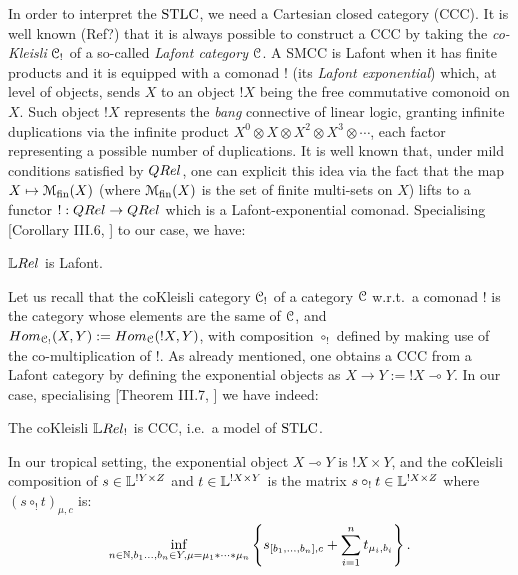 
In order to interpret the $\mathrm{STLC}$, we need a Cartesian closed category (CCC).
It is well known ({\color{red}Ref?}) that it is always possible to construct a CCC by taking the \emph{co-Kleisli} $\mathcal{C}_!$ of a so-called \emph{Lafont category} $\mathcal{C}$.
A SMCC is Lafont when it has finite products and it is equipped with a comonad $!$ (its \emph{Lafont exponential}) which, at level of objects, sends $X$ to an object $!X$ being the free commutative comonoid on $X$.
Such object $!X$ represents the \emph{bang} connective of linear logic, granting infinite duplications via the infinite product $X^0\otimes X\otimes X^2\otimes X^3\otimes\cdots$, each factor representing a possible number of duplications.
It is well known that, under mild conditions satisfied by $\QREL$, one can explicit this idea via the fact that the map $X\mapsto \mathcal{M}_{\mathrm{fin}}(X)$ (where $\mathcal{M}_{\mathrm{fin}}(X)$ is the set of finite multi-sets on $X$) lifts to a functor $!:\QREL\to\QREL$ which is a Lafont-exponential comonad.
Specialising [Corollary III.6, \cite{Manzo2013}] to our case, we have:

\begin{fact}
 $\LREL$ is Lafont.
\end{fact}

Let us recall that the coKleisli category $\mathcal{C}_!$ of a category $\mathcal{C}$ w.r.t.\ a comonad $!$ is the category whose elements are the same of $\mathcal{C}$, and $\HOM{\C C_!}{X}{Y}:=\HOM{\C C}{!X}{Y}$, with composition $\circ_!$ defined by making use of the co-multiplication of $!$.
As already mentioned, one obtains a CCC from a Lafont category by defining the exponential objects as $X\to Y:=!X \multimap Y$.
In our case, specialising [Theorem III.7, \cite{Manzo2013}] we have indeed:
\begin{fact}
 The coKleisli $\LREL_!$ is CCC, i.e.\ a model of $\mathrm{STLC}$.
\end{fact}

In our tropical setting, 
the exponential object $X\multimap Y$ is $!X\times Y$, and 
the coKleisli composition of $s\in\mathbb{L}^{!Y\times Z}$ and $t\in\mathbb{L}^{!X\times Y}$ is the matrix $s\circ_! t\in\mathbb{L}^{!X\times Z}$ where $(s\circ_! t)_{\mu,c}$ is:
\begin{align}
 \inf\limits_{n\in\mathbb{N}, b_1\dots,b_n\in Y, \mu = \mu_1*\cdots *\mu_n}
 \left\{s_{[b_1,\dots,b_n],c} + \sum\limits_{i=1}^n t_{\mu_i,b_i}\right\}.
\end{align}

